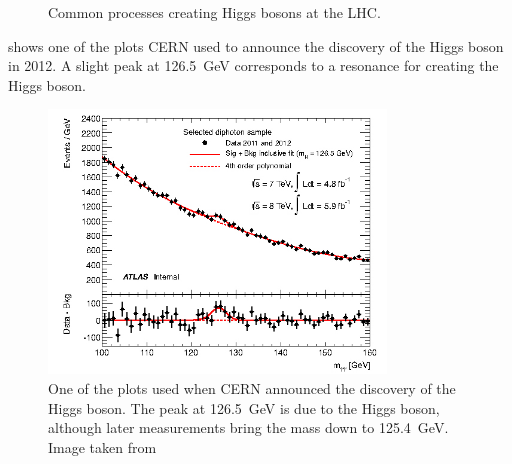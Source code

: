 \documentclass[fleqn]{NotesClass}
\newcommand{\Pparticle}[1]{\symup{#1}}
\newcommand{\Pt}{\ensuremath{\Pparticle{t}}}
\newcommand{\Pb}{\ensuremath{\Pparticle{b}}}
\newcommand{\PW}{\ensuremath{\Pparticle{W}}}
\newcommand{\Pq}{\ensuremath{\Pparticle{q}}}
\newcommand{\Phiggs}{\ensuremath{\Pparticle{H}}}
\begin{document}
\begin{figure}
        \caption{Common processes creating Higgs bosons at the LHC.}
        \label{fig:higgs production}
    \end{figure}
    
     shows one of the plots CERN used to announce the discovery of the Higgs boson in 2012.
    A slight peak at \qty{126.5}{\giga\electronvolt} corresponds to a resonance for creating the Higgs boson.
    
    \begin{figure}
        \includegraphics[width=0.8\textwidth]{images/higgs-discovery}
        \caption{One of the plots used when CERN announced the discovery of the Higgs boson. The peak at \qty{126.5}{\giga\electronvolt} is due to the Higgs boson, although later measurements bring the mass down to \qty{125.4}{\giga\electronvolt}. Image taken from \cite{higgsDiscovery}}
        \label{fig:higgs discovery}
    \end{figure}
    
    \appendixpage
    \begin{appendices}
        
        
        
        
    \end{appendices}
    
\end{document}
